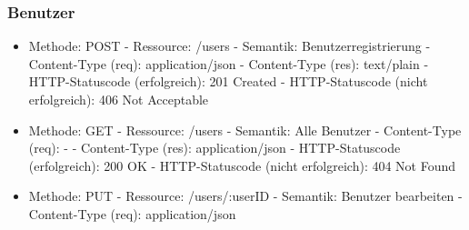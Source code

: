 	\subsubsection{Benutzer}
	\begin{itemize}
	\item Methode: POST\newline
	\noindent\hspace*{10mm} - Ressource: /users \newline
	\noindent\hspace*{10mm} - Semantik: Benutzerregistrierung \newline
	\noindent\hspace*{10mm} - Content-Type (req): application/json \newline
	\noindent\hspace*{10mm} - Content-Type (res): text/plain \newline
	\noindent\hspace*{10mm} - HTTP-Statuscode (erfolgreich): 201 Created \newline
	\noindent\hspace*{10mm} - HTTP-Statuscode (nicht erfolgreich): 406 Not Acceptable
	\item Methode: GET\newline
	\noindent\hspace*{10mm} - Ressource: /users \newline
	\noindent\hspace*{10mm} - Semantik: Alle Benutzer \newline
	\noindent\hspace*{10mm} - Content-Type (req): - \newline
	\noindent\hspace*{10mm} - Content-Type (res): application/json \newline
	\noindent\hspace*{10mm} - HTTP-Statuscode (erfolgreich): 200 OK \newline
	\noindent\hspace*{10mm} - HTTP-Statuscode (nicht erfolgreich): 404 Not Found
	\item Methode: PUT\newline
	\noindent\hspace*{10mm} - Ressource: /users/:userID \newline
	\noindent\hspace*{10mm} - Semantik: Benutzer bearbeiten \newline
	\noindent\hspace*{10mm} - Content-Type (req): application/json \newline

\end{itemize}
